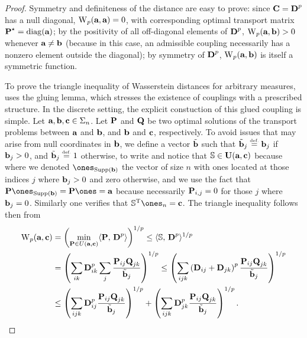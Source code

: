 \begin{proof}
Symmetry and definiteness of the distance are easy to prove: since $\C = \distD^p$ has a null diagonal, $\WassD_p(\a,\a)=0$, with corresponding optimal transport matrix $\P^\star=\diag(\a)$; by the positivity of all off-diagonal elements of $\distD^p$, $\WassD_p(\a,\b)>0$ whenever $\a\ne \b$ (because in this case, an admissible coupling necessarily has a nonzero element outside the diagonal); by symmetry of $\distD^p$, $\WassD_p(\a,\b)$ is itself a symmetric function.


To prove the triangle inequality of Wasserstein distances for arbitrary measures, \citet[Theorem 7.3]{Villani03} uses the gluing lemma, which stresses the existence of couplings with a prescribed structure.
In the discrete setting, the explicit constuction of this glued coupling is simple.
%
Let $\a,\b,\VectMode{c} \in\simplex_n$. Let $\P$ and $\Q$ be two optimal solutions of the transport problems between $\a$ and $\b$, and $\b$ and $\VectMode{c}$, respectively.
%
To avoid issues that may arise from null coordinates in $\b$, we define a vector $\tilde{\b}$ such that $\tilde\b_j \eqdef \b_j$ if $\b_j>0$, and $\tilde{\b}_j\eqdef 1$ otherwise, to write
and notice that $\SS \in \CouplingsD(\a,\VectMode{c})$ because
where we denoted $\ones_{\Supp(\b)}$ the vector of size $n$ with ones located at those indices $j$ where $\b_j>0$ and zero otherwise, and we use the fact that $\P \ones_{\Supp(\b)} = \P \ones = \a$ because necessarily $\P_{i,j} = 0$ for those $j$ where $\b_j=0$. Similarly one verifies that $\transp{\SS} \ones_n = \VectMode{c}$. The triangle inequality follows then from
\begin{align*}
\WassD_p(\a,\VectMode{c})&=\left(\min_{\P\in U(\a,\VectMode{c})}\dotp{\P}{\distD^p}\right)^{1/p} \leq \dotp{\SS}{\distD^p}^{1/p}\\
&= \left(\sum_{ik} \distD^p_{ik}\sum_{j} \frac{\P_{ij}\Q_{jk}}{\tilde{\b}_j}\right)^{1/p} \leq \left(\sum_{ijk} \left(\distD_{ij}+\distD_{jk}\right)^p \frac{\P_{ij}\Q_{jk}}{\tilde{\b}_j}\right)^{1/p} \\
& \leq \left(\sum_{ijk} \distD^p_{ij} \frac{\P_{ij}\Q_{jk}}{\tilde{\b}_j}\right)^{1/p} + \left(\sum_{ijk}\distD^p_{jk} \frac{\P_{ij}\Q_{jk}}{\tilde{\b}_j}\right)^{1/p}.
\end{align*}

\end{proof}
